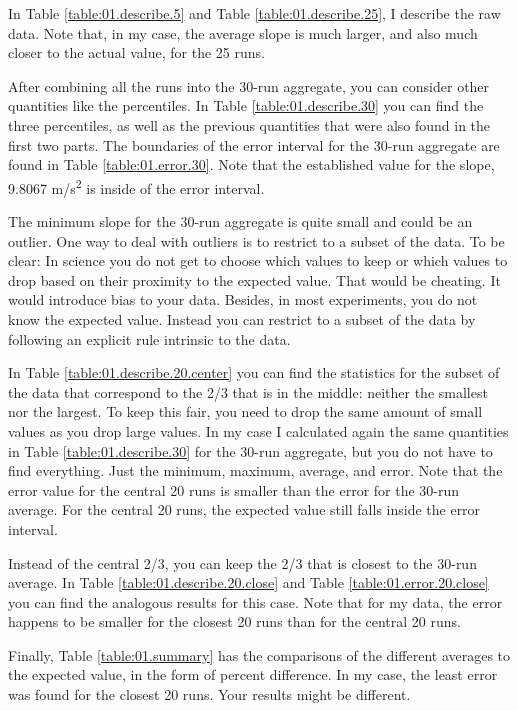 In Table \ref{table:01.describe.5} and Table \ref{table:01.describe.25}, I describe the raw data. Note that, in my case, the average slope is much larger, and also much closer to the actual value, for the 25 runs.

After combining all the runs into the 30-run aggregate, you can consider other quantities like the percentiles. In Table \ref{table:01.describe.30} you can find the three percentiles, as well as the previous quantities that were also found in the first two parts. The boundaries of the error interval for the 30-run aggregate are found in Table \ref{table:01.error.30}. Note that the established value for the slope, 9.8067 m/s\textsuperscript{2} is inside of the error interval.

The minimum slope for the 30-run aggregate is quite small and could be an outlier. One way to deal with outliers is to restrict to a subset of the data. To be clear: In science you do not get to choose which values to keep or which values to drop based on their proximity to the expected value. That would be cheating. It would introduce bias to your data. Besides, in most experiments, you do not know the expected value. Instead you can restrict to a subset of the data by following an explicit rule intrinsic to the data.

In Table \ref{table:01.describe.20.center} you can find the statistics for the subset of the data that correspond to the 2/3 that is in the middle: neither the smallest nor the largest. To keep this fair, you need to drop the same amount of small values as you drop large values. In my case I calculated again the same quantities in Table \ref{table:01.describe.30} for the 30-run aggregate, but you do not have to find everything. Just the minimum, maximum, average, and error. Note that the error value for the central 20 runs is smaller than the error for the 30-run average. For the central 20 runs, the expected value still falls inside the error interval.

Instead of the central 2/3, you can keep the 2/3 that is closest to the 30-run average. In Table \ref{table:01.describe.20.close} and Table \ref{table:01.error.20.close} you can find the analogous results for this case. Note that for my data, the error happens to be smaller for the closest 20 runs than for the central 20 runs.

Finally, Table \ref{table:01.summary} has the comparisons of the different averages to the expected value, in the form of percent difference. In my case, the least error was found for the closest 20 runs. Your results might be different.
%

